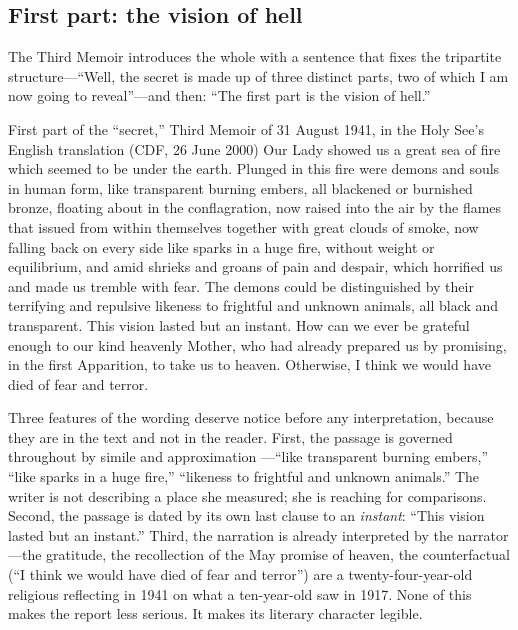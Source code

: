 \subsection{First part: the vision of hell}

The Third Memoir introduces the whole with a sentence that fixes the
tripartite structure---``Well, the secret is made up of three distinct
parts, two of which I am now going to reveal''---and then: ``The first
part is the vision of hell.''

\begin{operativetext}{First part of the ``secret,'' Third Memoir of
31 August 1941, in the Holy See's English translation (CDF, 26 June
2000)}
Our Lady showed us a great sea of fire which seemed to be under the
earth. Plunged in this fire were demons and souls in human form, like
transparent burning embers, all blackened or burnished bronze,
floating about in the conflagration, now raised into the air by the
flames that issued from within themselves together with great clouds
of smoke, now falling back on every side like sparks in a huge fire,
without weight or equilibrium, and amid shrieks and groans of pain
and despair, which horrified us and made us tremble with fear. The
demons could be distinguished by their terrifying and repulsive
likeness to frightful and unknown animals, all black and transparent.
This vision lasted but an instant. How can we ever be grateful enough
to our kind heavenly Mother, who had already prepared us by
promising, in the first Apparition, to take us to heaven. Otherwise,
I think we would have died of fear and terror.
\end{operativetext}

Three features of the wording deserve notice before any
interpretation, because they are in the text and not in the reader.
First, the passage is governed throughout by simile and approximation
---``like transparent burning embers,'' ``like sparks in a huge
fire,'' ``likeness to frightful and unknown animals.'' The writer is
not describing a place she measured; she is reaching for comparisons.
Second, the passage is dated by its own last clause to an
\emph{instant}: ``This vision lasted but an instant.'' Third, the
narration is already interpreted by the narrator---the gratitude, the
recollection of the May promise of heaven, the counterfactual (``I
think we would have died of fear and terror'') are a
twenty-four-year-old religious reflecting in 1941 on what a
ten-year-old saw in 1917. None of this makes the report less serious.
It makes its literary character legible.

